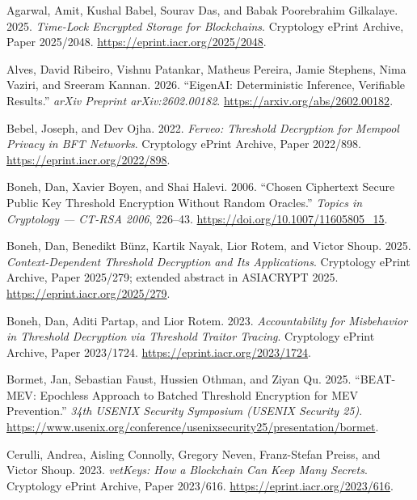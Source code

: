 \documentclass[
]{article}
\newlength{\cslhangindent}
\newenvironment{CSLReferences}[2] %
 {\begin{list}{}{%
  \setlength{\itemindent}{0pt}
  \setlength{\leftmargin}{0pt}
  \setlength{\parsep}{0pt}
  \ifodd #1
   \setlength{\leftmargin}{\cslhangindent}
   \setlength{\itemindent}{-1\cslhangindent}
  \fi
  \setlength{\itemsep}{#2\baselineskip}}}
 {\end{list}}
\begin{document}
\protect{}\label{refs}
\begin{CSLReferences}{1}{1}
Agarwal, Amit, Kushal Babel, Sourav Das, and Babak Poorebrahim
Gilkalaye. 2025. \emph{Time-Lock Encrypted Storage for Blockchains}.
Cryptology {ePrint} Archive, Paper 2025/2048.
\url{https://eprint.iacr.org/2025/2048}.

Alves, David Ribeiro, Vishnu Patankar, Matheus Pereira, Jamie Stephens,
Nima Vaziri, and Sreeram Kannan. 2026. {``{EigenAI: Deterministic
Inference, Verifiable Results}.''} \emph{arXiv Preprint
arXiv:2602.00182}. \url{https://arxiv.org/abs/2602.00182}.

Bebel, Joseph, and Dev Ojha. 2022. \emph{Ferveo: Threshold Decryption
for Mempool Privacy in {BFT} Networks}. Cryptology {ePrint} Archive,
Paper 2022/898. \url{https://eprint.iacr.org/2022/898}.

Boneh, Dan, Xavier Boyen, and Shai Halevi. 2006. {``Chosen Ciphertext
Secure Public Key Threshold Encryption Without Random Oracles.''}
\emph{Topics in Cryptology --- {CT-RSA} 2006}, 226--43.
\url{https://doi.org/10.1007/11605805_15}.

Boneh, Dan, Benedikt Bünz, Kartik Nayak, Lior Rotem, and Victor Shoup.
2025. \emph{Context-Dependent Threshold Decryption and Its
Applications}. Cryptology {ePrint} Archive, Paper 2025/279; extended
abstract in ASIACRYPT 2025. \url{https://eprint.iacr.org/2025/279}.

Boneh, Dan, Aditi Partap, and Lior Rotem. 2023. \emph{Accountability for
Misbehavior in Threshold Decryption via Threshold Traitor Tracing}.
Cryptology {ePrint} Archive, Paper 2023/1724.
\url{https://eprint.iacr.org/2023/1724}.

Bormet, Jan, Sebastian Faust, Hussien Othman, and Ziyan Qu. 2025.
{``{BEAT-MEV}: Epochless Approach to Batched Threshold Encryption for
{MEV} Prevention.''} \emph{34th USENIX Security Symposium (USENIX
Security 25)}.
\url{https://www.usenix.org/conference/usenixsecurity25/presentation/bormet}.

Cerulli, Andrea, Aisling Connolly, Gregory Neven, Franz-Stefan Preiss,
and Victor Shoup. 2023. \emph{{vetKeys}: How a Blockchain Can Keep Many
Secrets}. Cryptology {ePrint} Archive, Paper 2023/616.
\url{https://eprint.iacr.org/2023/616}.


\end{CSLReferences}
\end{document}
